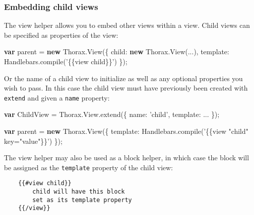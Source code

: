 \documentclass[9pt]{book}
\newenvironment{Shaded}{}{}
\newcommand{\KeywordTok}[1]{\textcolor[rgb]{0.00,0.44,0.13}{\textbf{{#1}}}}
\newcommand{\DataTypeTok}[1]{\textcolor[rgb]{0.56,0.13,0.00}{{#1}}}
\newcommand{\StringTok}[1]{\textcolor[rgb]{0.25,0.44,0.63}{{#1}}}
\newcommand{\OtherTok}[1]{\textcolor[rgb]{0.00,0.44,0.13}{{#1}}}
\newcommand{\FunctionTok}[1]{\textcolor[rgb]{0.02,0.16,0.49}{{#1}}}
\newcommand{\NormalTok}[1]{{#1}}
\begin{document}
\subsubsection{Embedding child views}\label{embedding-child-views}

The view helper allows you to embed other views within a view. Child
views can be specified as properties of the view:

\begin{Shaded}
\begin{Highlighting}[]
    \KeywordTok{var} \NormalTok{parent = }\KeywordTok{new} \OtherTok{Thorax}\NormalTok{.}\FunctionTok{View}\NormalTok{(\{}
        \DataTypeTok{child}\NormalTok{: }\KeywordTok{new} \OtherTok{Thorax}\NormalTok{.}\FunctionTok{View}\NormalTok{(...),}
        \DataTypeTok{template}\NormalTok{: }\OtherTok{Handlebars}\NormalTok{.}\FunctionTok{compile}\NormalTok{(}\StringTok{'\{\{view child\}\}'}\NormalTok{)}
    \NormalTok{\});}
\end{Highlighting}
\end{Shaded}

Or the name of a child view to initialize as well as any optional
properties you wish to pass. In this case the child view must have
previously been created with \texttt{extend} and given a \texttt{name}
property:

\begin{Shaded}
\begin{Highlighting}[]
    \KeywordTok{var} \NormalTok{ChildView = }\OtherTok{Thorax}\NormalTok{.}\OtherTok{View}\NormalTok{.}\FunctionTok{extend}\NormalTok{(\{}
        \DataTypeTok{name}\NormalTok{: }\StringTok{'child'}\NormalTok{,}
        \DataTypeTok{template}\NormalTok{: ...}
    \NormalTok{\});}
  
    \KeywordTok{var} \NormalTok{parent = }\KeywordTok{new} \OtherTok{Thorax}\NormalTok{.}\FunctionTok{View}\NormalTok{(\{}
        \DataTypeTok{template}\NormalTok{: }\OtherTok{Handlebars}\NormalTok{.}\FunctionTok{compile}\NormalTok{(}\StringTok{'\{\{view "child" key="value"\}\}'}\NormalTok{)}
    \NormalTok{\});}
\end{Highlighting}
\end{Shaded}

The view helper may also be used as a block helper, in which case the
block will be assigned as the \texttt{template} property of the child
view:

\begin{verbatim}
    {{#view child}}
        child will have this block
        set as its template property
    {{/view}}
\end{verbatim}
\end{document}

